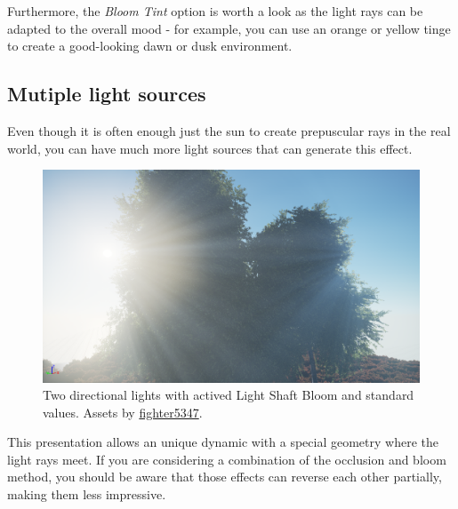 \documentclass[A4]{article}
\begin{document}
	Furthermore, the \textit{Bloom Tint} option is worth a look as the light rays can be adapted to the overall mood - for example, you can use an orange or yellow tinge to create a good-looking dawn or dusk environment.
	
	\subsection*{Mutiple light sources}
	Even though it is often enough just the sun to create prepuscular rays in the real world, you can have much more light sources that can generate this effect.
	\begin{figure}
		\vspace{-20px}
		\begin{center}
			\includegraphics[scale=0.13]{MultipleLights.png}
		\end{center}
		\vspace{-20px}
		\caption{Two directional lights with actived Light Shaft Bloom and standard values. Assets by \href{https://forums.unrealengine.com/showthread.php?59812-FREE-Foliage-Starter-Kit}{fighter5347}.}
	\end{figure}
	This presentation allows an unique dynamic with a special geometry where the light rays meet. If you are considering a combination of the occlusion and bloom method, you should be aware that those effects can reverse each other partially, making them less impressive.
	
\end{document}
